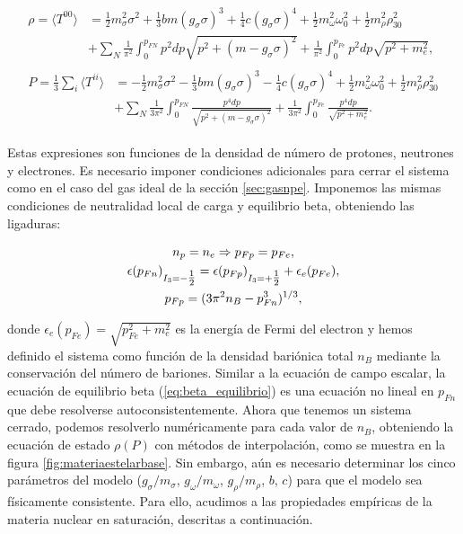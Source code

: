 \begin{gather}
	\begin{aligned}
		\rho = \langle T^{00} \rangle &= \frac{1}{2}m_\sigma^2\sigma^2 + \frac{1}{3}bm(g_\sigma\sigma)^3 + \frac{1}{4}c(g_\sigma\sigma)^4 + \frac{1}{2}m_\omega^2\omega_0^2 + \frac{1}{2}m_\rho^2\rho_{30}^2 \\
		&+ \sum_N \frac{1}{\pi^2}\int_0^{p_{FN}} p^2 dp \sqrt{p^2 + (m-g_\sigma\sigma)^2} + \frac{1}{\pi^2}\int_0^{p_{Fe}} p^2 dp \sqrt{p^2 + m_e^2},
		\label{eq:densidad_energia}
	\end{aligned} \\
	\begin{aligned}
		P = \frac{1}{3}\sum_i \langle T^{ii} \rangle &= - \frac{1}{2}m_\sigma^2\sigma^2 - \frac{1}{3}bm(g_\sigma\sigma)^3 - \frac{1}{4}c(g_\sigma\sigma)^4 + \frac{1}{2}m_\omega^2\omega_0^2 + \frac{1}{2}m_\rho^2\rho_{30}^2 \\
		&+ \sum_N \frac{1}{3\pi^2}\int_0^{p_{FN}} \frac{p^4 dp}{\sqrt{p^2 + (m-g_\sigma\sigma)^2}} + \frac{1}{3\pi^2}\int_0^{p_{Fe}} \frac{p^4 dp}{\sqrt{p^2 + m_e^2}}.
		\label{eq:presion}
	\end{aligned}
\end{gather}

Estas expresiones son funciones de la densidad de número de protones, neutrones y electrones. Es necesario imponer condiciones adicionales para cerrar el sistema como en el caso del gas ideal de la sección \ref{sec:gasnpe}. Imponemos las mismas condiciones de neutralidad local de carga y equilibrio beta, obteniendo las ligaduras: 

\begin{gather}
	n_p = n_e \Rightarrow p_{Fp} = p_{Fe}, \\
	\epsilon(p_{Fn})_{I_3=-\tfrac{1}{2}} = \epsilon(p_{Fp})_{I_3=+\tfrac{1}{2}} + \epsilon_e(p_{Fe}), \label{eq:beta_equilibrio} \\
	p_{Fp} = (3\pi^2n_B - p_{Fn}^3)^{1/3},
\end{gather}

donde $\epsilon_e(p_{Fe}) = \sqrt{p_{Fe}^2 + m_e^2}$ es la energía de Fermi del electron y hemos definido el sistema como función de la densidad bariónica total $n_B$ mediante la conservación del número de bariones. Similar a la ecuación de campo escalar, la ecuación de equilibrio beta (\ref{eq:beta_equilibrio}) es una ecuación no lineal en $p_{Fn}$ que debe resolverse autoconsistentemente. Ahora que tenemos un sistema cerrado, podemos resolverlo numéricamente para cada valor de $n_B$, obteniendo la ecuación de estado $\rho(P)$ con métodos de interpolación, como se muestra en la figura \ref{fig:materiaestelarbase}. Sin embargo, aún es necesario determinar los cinco parámetros del modelo ($g_\sigma/m_\sigma$, $g_\omega/m_\omega$, $g_\rho/m_\rho$, $b$, $c$) para que el modelo sea físicamente consistente. Para ello, acudimos a las propiedades empíricas de la materia nuclear en saturación, descritas a continuación.

